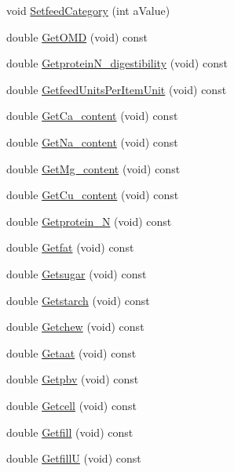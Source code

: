 \begin{DoxyCompactItemize}
\item 
void \hyperlink{classfeed_item_aba08642a5aff1cc7222aaba9eb36f49a}{SetfeedCategory} (int aValue)
\item 
double \hyperlink{classfeed_item_a94fa874b2d66b1443fc2ebc26d4529aa}{GetOMD} (void) const 
\item 
double \hyperlink{classfeed_item_ac8e08bb19948212eccc3373ef2723be7}{GetproteinN\_\-digestibility} (void) const 
\item 
double \hyperlink{classfeed_item_a314101a64ec737a5927486a170221354}{GetfeedUnitsPerItemUnit} (void) const 
\item 
double \hyperlink{classfeed_item_a4d1c2b2b2a7712efa574f7449778ea2e}{GetCa\_\-content} (void) const 
\item 
double \hyperlink{classfeed_item_a0f82281bae07b0e543d12b3bcd73ffb7}{GetNa\_\-content} (void) const 
\item 
double \hyperlink{classfeed_item_ae07f366eec4cd04e9341405529c7dde7}{GetMg\_\-content} (void) const 
\item 
double \hyperlink{classfeed_item_ad7d0fb1b1df2e1b4bff4a88a731ca228}{GetCu\_\-content} (void) const 
\item 
double \hyperlink{classfeed_item_ae861dd22a8969ae2dabb00a2045f007c}{Getprotein\_\-N} (void) const 
\item 
double \hyperlink{classfeed_item_a83f57e603885d754d3bcdda09ab7957b}{Getfat} (void) const 
\item 
double \hyperlink{classfeed_item_a3f055d5bbb0f6466051560ce8806ed3f}{Getsugar} (void) const 
\item 
double \hyperlink{classfeed_item_a59a3cebd74f8c35ac5f4459ea9d837a1}{Getstarch} (void) const 
\item 
double \hyperlink{classfeed_item_abba921ea9d212032fd7b26f9b88a914b}{Getchew} (void) const 
\item 
double \hyperlink{classfeed_item_af006fe328a679e742fea693274e4cd18}{Getaat} (void) const 
\item 
double \hyperlink{classfeed_item_a1092222b8a89b1da63be44700369ba98}{Getpbv} (void) const 
\item 
double \hyperlink{classfeed_item_a9dfd0196ca3903aa35cd16cf4347e24f}{Getcell} (void) const 
\item 
double \hyperlink{classfeed_item_a8cbb0277a129786ec0ab344889f79023}{Getfill} (void) const 
\item 
double \hyperlink{classfeed_item_af97130ef91880018163acbc8dbe1e22c}{GetfillU} (void) const 
\item 

\end{DoxyCompactItemize}

